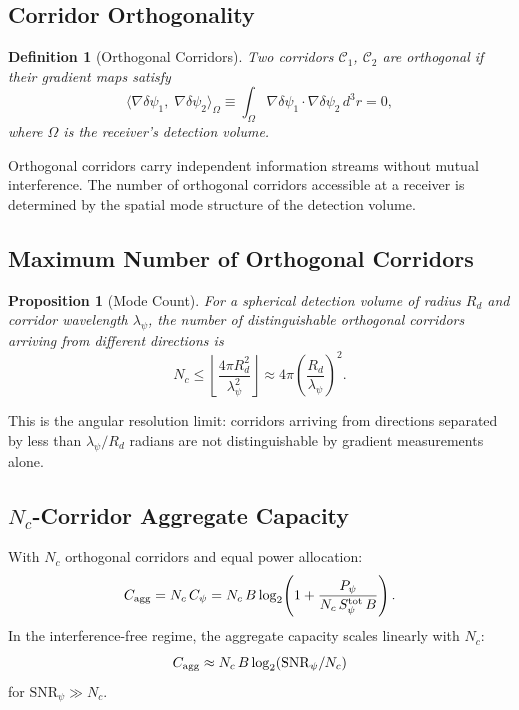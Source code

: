 \documentclass[twocolumn,superscriptaddress,prd,nofootinbib]{revtex4-2}
\newcommand{\SNR}{\mathrm{SNR}}
\newcommand{\Corridor}{\mathcal{C}}
\newtheorem{proposition}[theorem]{Proposition}
\newtheorem{definition}{Definition}
\begin{document}
\subsection{Corridor Orthogonality}

\begin{definition}[Orthogonal Corridors]
Two corridors $\Corridor_1$, $\Corridor_2$ are orthogonal if their
gradient maps satisfy
\begin{equation}
\langle \nabla\delta\psi_1,\;\nabla\delta\psi_2 \rangle_\Omega
\equiv \int_\Omega \nabla\delta\psi_1 \cdot \nabla\delta\psi_2\,d^3r
= 0,
\label{eq:orthogonality}
\end{equation}
where $\Omega$ is the receiver's detection volume.
\end{definition}

Orthogonal corridors carry independent information streams without
mutual interference.
The number of orthogonal corridors accessible at a receiver is
determined by the spatial mode structure of the detection volume.

\subsection{Maximum Number of Orthogonal Corridors}

\begin{proposition}[Mode Count]
\label{prop:mode-count}
For a spherical detection volume of radius $R_d$ and corridor
wavelength $\lambda_\psi$, the number of distinguishable orthogonal
corridors arriving from different directions is
\begin{equation}
N_c \leq \left\lfloor\frac{4\pi R_d^2}{\lambda_\psi^2}\right\rfloor
\approx 4\pi\!\left(\frac{R_d}{\lambda_\psi}\right)^2.
\label{eq:mode-count}
\end{equation}
\end{proposition}

This is the angular resolution limit: corridors arriving from directions
separated by less than $\lambda_\psi / R_d$ radians are not
distinguishable by gradient measurements alone.

\subsection{$N_c$-Corridor Aggregate Capacity}

With $N_c$ orthogonal corridors and equal power allocation:
\begin{equation}
C_{\rm agg} = N_c\,C_\psi = N_c\,B\log_2\!\left(1 +
\frac{P_\psi}{N_c\,S_\psi^{\rm tot}\,B}\right).
\label{eq:aggregate-capacity}
\end{equation}
In the interference-free regime, the aggregate capacity scales linearly
with $N_c$:
\begin{equation}
C_{\rm agg} \approx N_c\,B\log_2(\SNR_\psi/N_c)
\label{eq:aggregate-highSNR}
\end{equation}
for $\SNR_\psi \gg N_c$.
\end{document}
